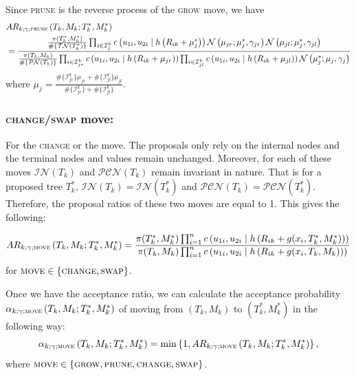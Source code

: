 \documentclass[
12pt]{article}
\begin{document}
	Since \textsc{prune} is the reverse process of the \textsc{grow} move, we have
	\begin{align*}
		&AR_{k;\gamma;\textsc{prune}}\left(T_k,M_k;T_k^{\ast}, M_k^{\ast}\right)\\
		&= \frac{
			\frac{\pi(T^{\ast}_k,M^{\ast}_k)}{\#\{\mathcal{TN}(T^{\ast}_k)\}} 
			\prod_{i\in \mathcal{I}_{j}^k}c\left(u_{1i},u_{2i}\mid h\left(R_{ik}+\mu^{\ast}_j\right)\right) 
			\mathcal{N}\left(\mu_{jr};\mu^{\ast}_{j},\gamma_{jr}\right)
			\mathcal{N}\left(\mu_{jl};\mu^{\ast}_{j},\gamma_{jl}\right)}
		{\frac{\pi(T_k,M_k)}{\#\{\mathcal{PN}(T_k)\}} 
			\prod_{i\in \mathcal{I}_{jr}^k}c\left(u_{1i},u_{2i}\mid h\left(R_{ik}+\mu_{jr}\right)\right)
			\prod_{i\in \mathcal{I}_{jl}^k}c\left(u_{1i},u_{2i}\mid h\left(R_{ik}+\mu_{jl}\right)\right)
			\mathcal{N}\left(\mu^{\ast}_j;\mu_{j},\gamma_j\right)}
	\end{align*}
	where $\mu_j = \frac{\#\{\mathcal{I}^k_{jr}\}\mu_{jr} + \#\{\mathcal{I}^k_{jl}\}\mu_{jl}}{\#\{\mathcal{I}^k_{jr}\} + \#\{\mathcal{I}^k_{jl}\}}$.
	
	\subsubsection{\textsc{change}/\textsc{swap} move:}
	For the \textsc{change} or the  move. The proposals only rely on the internal nodes and the terminal nodes and values remain unchanged. Moreover, for each of these moves $\mathcal{IN}(T_k)$ and $\mathcal{PCN}(T_k)$ remain invariant in nature. That is for a proposed tree $T_k^{\ast}$, $\mathcal{IN}(T_k)=\mathcal{IN}(T_k^{\ast})$ and $\mathcal{PCN}(T_k)=\mathcal{PCN}(T_k^{\ast})$. Therefore, the proposal ratios of these two moves are equal to 1. This gives the following:
	
	\begin{align*}
		AR_{k;\gamma;\textsc{move}}\left(T_k,M_k;T_k^{\ast}, M_k^{\ast}\right)= \frac{
			\pi(T^{\ast}_k,M^{\ast}_k) 
			\prod_{i=1}^{n}c\left(u_{1i},u_{2i}\mid h\left(R_{ik}+g(x_i, T_k^{\ast}, M_k^{\ast})\right)\right)}
		{\pi(T_k,M_k) 
			\prod_{i=1}^{n}c\left(u_{1i},u_{2i}\mid h\left(R_{ik}+g(x_i, T_k, M_k)\right)\right)}
	\end{align*}
	for $\textsc{move}\in\{\textsc{change},\textsc{swap}\}$.
	
	Once we have the acceptance ratio, we can calculate the acceptance probability $\alpha_{k;\gamma;\textsc{move}}\left(T_k,M_k;T_k^{\ast}, M_k^{\ast}\right)$ of moving from $(T_k,M_k)$ to $(T_k^{\ast},M_k^{\ast})$ in the following way:
	\begin{equation*}
		\alpha_{k;\gamma;\textsc{move}}\left(T_k,M_k;T_k^{\ast}, M_k^{\ast}\right) = \min\left\{1,AR_{k;\gamma;\textsc{move}}\left(T_k,M_k;T_k^{\ast}, M_k^{\ast}\right)\right\},
	\end{equation*}
	where $\textsc{move}\in \left\{\textsc{grow}, \textsc{prune}, \textsc{change}, \textsc{swap}\right\}$.
	
\end{document}
